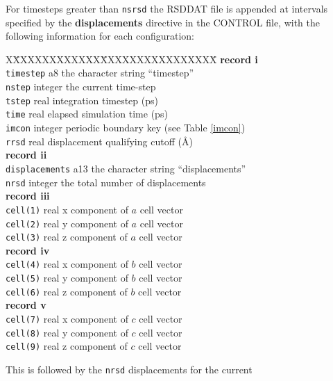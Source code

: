 For timesteps greater than {\tt nsrsd} the RSDDAT file is
appended at intervals specified by the {\bf displacements} directive
in the CONTROL file, with the following information for each
configuration:
\begin{tabbing}
X\=XXXXXXXXXXXX\=XXXXXXXXXXXXXXXX\=\kill
{\bf record i} \\
\> {\tt timestep}      \> a8      \> the character string ``timestep'' \\
\> {\tt nstep}         \> integer \> the current time-step \\
\> {\tt tstep}         \> real    \> integration timestep (ps) \\
\> {\tt time}          \> real    \> elapsed simulation time (ps) \\
\> {\tt imcon}         \> integer \> periodic boundary key (see Table \ref{imcon}) \\
\> {\tt rrsd}          \> real    \> displacement qualifying cutoff (\AA) \\
{\bf record ii} \\
\> {\tt displacements} \> a13     \> the character string ``displacements'' \\
\> {\tt nrsd}          \> integer \> the total number of displacements \\
{\bf record iii} \\
\> {\tt cell(1)}       \> real    \> x component of $a$ cell vector \\
\> {\tt cell(2)}       \> real    \> y component of $a$ cell vector \\
\> {\tt cell(3)}       \> real    \> z component of $a$ cell vector \\
{\bf record iv} \\
\> {\tt cell(4)}       \> real    \> x component of $b$ cell vector \\
\> {\tt cell(5)}       \> real    \> y component of $b$ cell vector \\
\> {\tt cell(6)}       \> real    \> z component of $b$ cell vector \\
{\bf record v} \\
\> {\tt cell(7)}       \> real    \> x component of $c$ cell vector \\
\> {\tt cell(8)}       \> real    \> y component of $c$ cell vector \\
\> {\tt cell(9)}       \> real    \> z component of $c$ cell vector \\
\end{tabbing}
This is followed by the {\tt nrsd} displacements for the current
